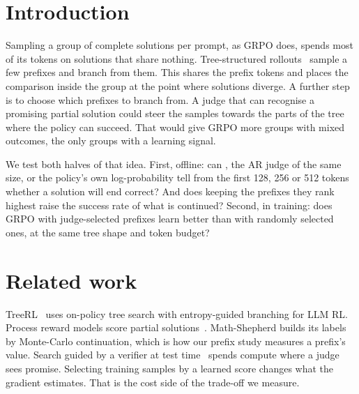 
\section{Introduction}\label{sec:intro}

Sampling a group of complete solutions per prompt, as GRPO does, spends most of its tokens on solutions that share
nothing. Tree-structured rollouts~\cite{hou2025treerl} sample a few prefixes and branch from them. This shares the
prefix tokens and places the comparison inside the group at the point where solutions diverge. A further step is to
choose which prefixes to branch from. A judge that can recognise a promising partial solution could steer the samples
towards the parts of the tree where the policy can succeed. That would give GRPO more groups with mixed outcomes, the
only groups with a learning signal.

We test both halves of that idea. First, offline: can \kev{}, the AR judge of the same size, or the policy's own
log-probability tell from the first 128, 256 or 512 tokens whether a solution will end correct? And does keeping the
prefixes they rank highest raise the success rate of what is continued? Second, in training: does GRPO with
judge-selected prefixes learn better than with randomly selected ones, at the same tree shape and token budget?

\section{Related work}\label{sec:related}

TreeRL~\cite{hou2025treerl} uses on-policy tree search with entropy-guided branching for LLM RL. Process reward models
score partial solutions~\cite{lightman2024verify,wang2024mathshepherd}. Math-Shepherd builds its labels by Monte-Carlo
continuation, which is how our prefix study measures a prefix's value. Search guided by a verifier at test
time~\cite{snell2025scaling} spends compute where a judge sees promise. Selecting training samples by a learned score
changes what the gradient estimates. That is the cost side of the trade-off we measure.

